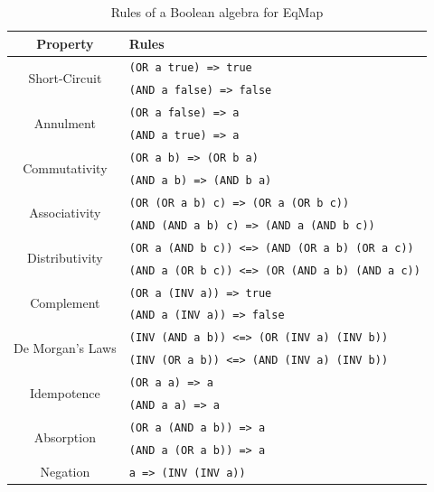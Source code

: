 \documentclass[10pt,letterpaper]{article}
\begin{document}
\begin{table}[h]
    \centering
    \begin{tabular}{cl}
        \toprule
        \textbf{Property}                 & \textbf{Rules}                                         \\ \midrule
        \multirow{2}{*}{Short-Circuit}    & \texttt{(OR a true) => true}                           \\
                                          & \texttt{(AND a false) => false}                        \\ \midrule
        \multirow{2}{*}{Annulment}        & \texttt{(OR a false) => a}                             \\
                                          & \texttt{(AND a true) => a}                             \\ \midrule
        \multirow{2}{*}{Commutativity}    & \texttt{(OR a b) => (OR b a)}                          \\
                                          & \texttt{(AND a b) => (AND b a)}                        \\ \midrule
        \multirow{2}{*}{Associativity}    & \texttt{(OR (OR a b) c) => (OR a (OR b c))}            \\
                                          & \texttt{(AND (AND a b) c) => (AND a (AND b c))}        \\ \midrule
        \multirow{2}{*}{Distributivity}   & \texttt{(OR a (AND b c)) <=> (AND (OR a b) (OR a c))}  \\
                                          & \texttt{(AND a (OR b c)) <=> (OR (AND a b) (AND a c))} \\ \midrule
        \multirow{2}{*}{Complement}       & \texttt{(OR a (INV a)) => true}                        \\
                                          & \texttt{(AND a (INV a)) => false}                      \\ \midrule
        \multirow{2}{*}{De Morgan's Laws} & \texttt{(INV (AND a b)) <=> (OR (INV a) (INV b))}      \\
                                          & \texttt{(INV (OR a b)) <=> (AND (INV a) (INV b))}      \\ \midrule
        \multirow{2}{*}{Idempotence}      & \texttt{(OR a a) => a}                                 \\
                                          & \texttt{(AND a a) => a}                                \\ \midrule
        \multirow{2}{*}{Absorption}       & \texttt{(OR a (AND a b)) => a}                         \\
                                          & \texttt{(AND a (OR a b)) => a}                         \\ \midrule
        Negation                          & \texttt{a => (INV (INV a))}                            \\
        \bottomrule
    \end{tabular}
    \caption{Rules of a Boolean algebra for EqMap}\label{tab:rules}
\end{table}
\end{document}
